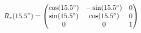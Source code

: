 \documentclass[preview]{standalone}
\begin{document}
\begin{align*}
\special{dvisvgm:raw <g id='unique000'>}R_z(15.5^\circ) = \begin{pmatrix} \cos(15.5^\circ) & -\sin(15.5^\circ) & 0 \\ \sin(15.5^\circ) & \cos(15.5^\circ) & 0 \\ 0 & 0 & 1 \end{pmatrix}\special{dvisvgm:raw </g>}
\end{align*}
\end{document}
